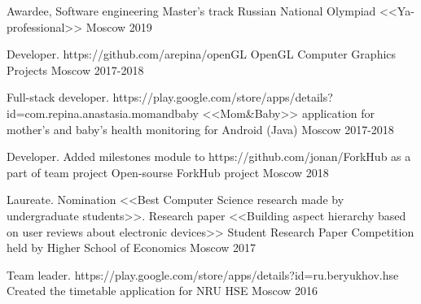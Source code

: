 


\vspace{0cm}\begin{cventries}

\cventry
{Awardee, Software engineering Master's track} %
{Russian National Olympiad <<Ya-professional>>} %
{Moscow} %
{2019} %
{}	
	

\cventry
{Developer. https://github.com/arepina/openGL} %
{OpenGL Computer Graphics Projects} %
{Moscow} %
{2017-2018} %
{}
		
	
\cventry
{Full-stack developer. https://play.google.com/store/apps/details?id=com.repina.anastasia.momandbaby} %
{<<Mom\&Baby>> application for mother's and baby's health monitoring for Android  (Java) } %
{Moscow} %
{2017-2018} %
{}
	

\cventry
{Developer. Added milestones module to https://github.com/jonan/ForkHub as a part of team project} %
{Open-sourse ForkHub project} %
{Moscow} %
{2018} %
{}

\cventry
{Laureate. Nomination <<Best Computer Science research made by undergraduate students>>. Research paper <<Building aspect hierarchy based on user reviews about electronic devices>>} %
{Student Research Paper Competition held by Higher School of Economics} %
{Moscow} %
{2017} %
{}

\cventry
{Team leader. https://play.google.com/store/apps/details?id=ru.beryukhov.hse} %
{Created the timetable application for NRU HSE} %
{Moscow} %
{2016} %
{}


\end{cventries}
